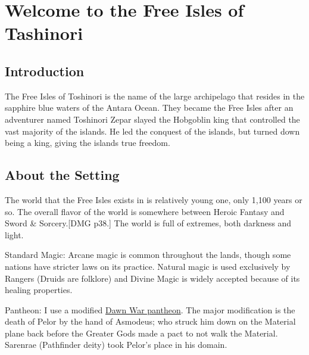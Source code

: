 \documentclass[letterpaper,10pt,twoside,twocolumn,openany]{book}
\begin{document}
	
	
	\chapter{Welcome to the Free Isles of Tashinori}
	
	\section{Introduction}
	
	The Free Isles of Toshinori is the name of the large archipelago that resides in the sapphire blue waters of the Antara Ocean. They became the Free Isles after an adventurer named Toshinori Zepar slayed the Hobgoblin king that controlled the vast majority of the islands. He led the conquest of the islands, but turned down being a king, giving the islands true freedom. 
	
	\section{About the Setting}
	
	The world that the Free Isles exists in is  relatively young one, only 1,100 years or so.  The overall flavor of the world is somewhere between Heroic Fantasy and Sword \& Sorcery.[DMG p38.] The world is full of extremes, both darkness and light.
	
	Standard Magic: Arcane magic is common throughout the lands, though some nations have stricter laws on its practice. Natural magic is used exclusively by Rangers (Druids are folklore) and Divine Magic is widely accepted because of its healing properties.
	
	Pantheon: I use a modified \href{https://stone-3.obsidianportal.com/wikis/the-dawn-war-pantheon}{Dawn War pantheon}. The major modification is the death of Pelor by the hand of Asmodeus; who struck him down on the Material plane back before the Greater Gods made a pact to not walk the Material. Sarenrae (Pathfinder deity) took Pelor’s place in his domain.	
	
\end{document}
